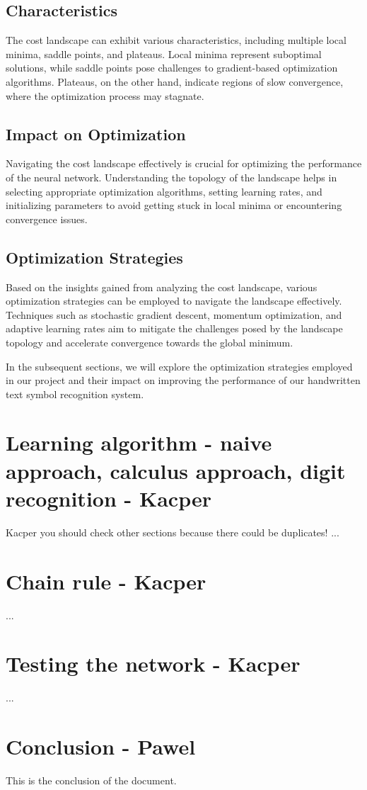 \documentclass{article}
\begin{document}
\subsection{Characteristics}
The cost landscape can exhibit various characteristics, including multiple local minima, saddle points, and plateaus. Local minima represent suboptimal solutions, while saddle points pose challenges to gradient-based optimization algorithms. Plateaus, on the other hand, indicate regions of slow convergence, where the optimization process may stagnate.

\subsection{Impact on Optimization}
Navigating the cost landscape effectively is crucial for optimizing the performance of the neural network. Understanding the topology of the landscape helps in selecting appropriate optimization algorithms, setting learning rates, and initializing parameters to avoid getting stuck in local minima or encountering convergence issues.

\subsection{Optimization Strategies}
Based on the insights gained from analyzing the cost landscape, various optimization strategies can be employed to navigate the landscape effectively. Techniques such as stochastic gradient descent, momentum optimization, and adaptive learning rates aim to mitigate the challenges posed by the landscape topology and accelerate convergence towards the global minimum.

In the subsequent sections, we will explore the optimization strategies employed in our project and their impact on improving the performance of our handwritten text symbol recognition system.

\newpage
\section{Learning algorithm - naive approach, calculus approach, digit recognition - Kacper}
Kacper you should check other sections because there could be duplicates!
...

\newpage
\section{Chain rule - Kacper}
...

\newpage
\section{Testing the network - Kacper}
...

\newpage
\section{Conclusion - Pawel}
This is the conclusion of the document.
\end{document}

